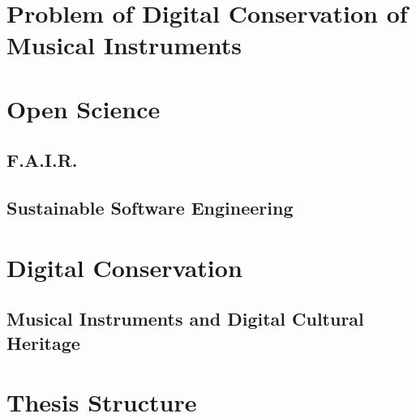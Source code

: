 
\section{Problem of Digital Conservation of Musical Instruments}

\section{Open Science}

\subsection{F.A.I.R.}
\subsection{Sustainable Software Engineering}

\section{Digital Conservation}

\subsection{Musical Instruments and Digital Cultural Heritage}

\section{Thesis Structure}
